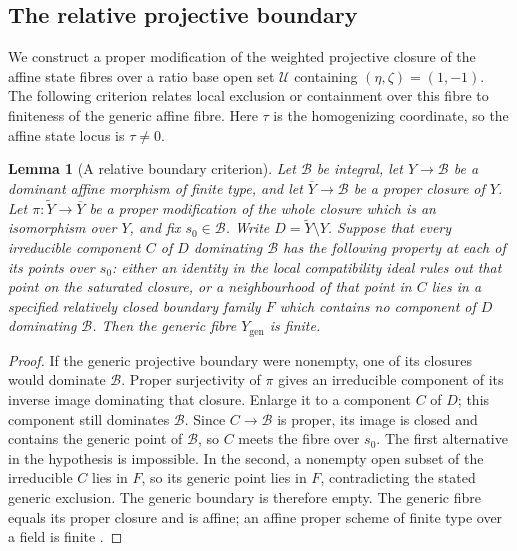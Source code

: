 \documentclass[11pt,a4paper]{article}
\numberwithin{equation}{section}
\theoremstyle{plain}
\newtheorem{lemma}[theorem]{Lemma}
\theoremstyle{definition}
\theoremstyle{remark}
\begin{document}
\subsection{The relative projective boundary}\label{r3:atlas}
We construct a proper modification of the weighted projective
closure of the affine state fibres over a ratio base open set
$\mathscr U$ containing $(\eta,\zeta)=(1,-1)$.
The following criterion relates local exclusion or containment
over this fibre to finiteness of the generic affine fibre.
Here $\tau$ is the homogenizing coordinate, so the affine state locus
is $\tau\ne0$.

\begin{lemma}[A relative boundary criterion]
\label{r3logic:propercriterion}
Let $\mathscr B$ be integral, let $Y\to \mathscr B$ be a dominant affine morphism of
finite type, and let $\overline Y\to \mathscr B$ be a proper closure of $Y$.
Let $\pi:\widetilde Y\to\overline Y$ be a proper modification of
the whole closure which is an isomorphism over $Y$, and fix
$s_0\in \mathscr B$. Write $D=\widetilde Y\setminus Y$.
Suppose that every irreducible component $C$ of $D$ dominating $\mathscr B$
has the following property at each of its points over $s_0$:
either an identity in the local compatibility ideal rules out that
point on the saturated closure, or a neighbourhood of that point
in $C$ lies in a specified relatively closed boundary family $F$
which contains no component of $D$ dominating $\mathscr B$. Then the generic fibre $Y_{\mathrm{gen}}$ is finite.
\end{lemma}
\begin{proof}
If the generic projective boundary were nonempty, one of its
closures would dominate $\mathscr B$. Proper surjectivity of $\pi$ gives
an irreducible component of its inverse image dominating that
closure. Enlarge it to a component $C$ of $D$; this component
still dominates $\mathscr B$. Since $C\to \mathscr B$ is proper, its image is closed
and contains the generic point of $\mathscr B$, so $C$ meets the fibre
over $s_0$. The first alternative in the hypothesis is impossible.
In the second, a nonempty open subset of the irreducible $C$ lies
in $F$, so its generic point lies in $F$, contradicting the stated
generic exclusion. The generic boundary is therefore empty.
The generic fibre equals its proper closure and is affine; an
affine proper scheme of finite type over a field is finite
\cite[Lemma~29.45.11, Tag~01WN]{StacksProject}.
\end{proof}
\end{document}
